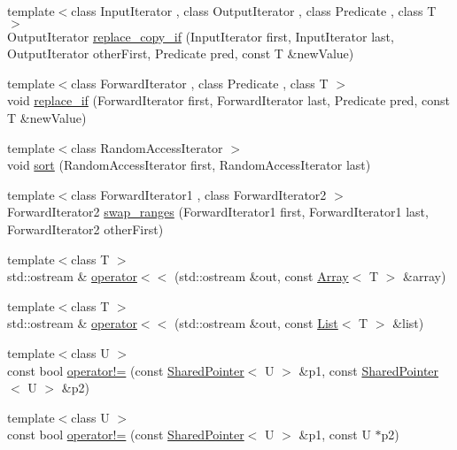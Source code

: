 \begin{DoxyCompactItemize}
\item 
{\footnotesize template$<$class Input\+Iterator , class Output\+Iterator , class Predicate , class T $>$ }\\Output\+Iterator \hyperlink{namespaceprism_a55d702599739f7137516dcd095119f15}{replace\+\_\+copy\+\_\+if} (Input\+Iterator first, Input\+Iterator last, Output\+Iterator other\+First, Predicate pred, const T \&new\+Value)
\item 
{\footnotesize template$<$class Forward\+Iterator , class Predicate , class T $>$ }\\void \hyperlink{namespaceprism_af118c19f6b5448319eb3aaf2d556ac54}{replace\+\_\+if} (Forward\+Iterator first, Forward\+Iterator last, Predicate pred, const T \&new\+Value)
\item 
{\footnotesize template$<$class Random\+Access\+Iterator $>$ }\\void \hyperlink{namespaceprism_af8ceeac6329dade75da361abe8b15c5f}{sort} (Random\+Access\+Iterator first, Random\+Access\+Iterator last)
\item 
{\footnotesize template$<$class Forward\+Iterator1 , class Forward\+Iterator2 $>$ }\\Forward\+Iterator2 \hyperlink{namespaceprism_a4661f2c0c4dca098c137179b4d93f3dc}{swap\+\_\+ranges} (Forward\+Iterator1 first, Forward\+Iterator1 last, Forward\+Iterator2 other\+First)
\item 
{\footnotesize template$<$class T $>$ }\\std\+::ostream \& \hyperlink{namespaceprism_a403ca8f79c481a89132691c0fd8c3a06}{operator$<$$<$} (std\+::ostream \&out, const \hyperlink{classprism_1_1_array}{Array}$<$ T $>$ \&array)
\item 
{\footnotesize template$<$class T $>$ }\\std\+::ostream \& \hyperlink{namespaceprism_a50da64555d454821545fe0311fde6a62}{operator$<$$<$} (std\+::ostream \&out, const \hyperlink{classprism_1_1_list}{List}$<$ T $>$ \&list)
\item 
{\footnotesize template$<$class U $>$ }\\const bool \hyperlink{namespaceprism_a9df924e4deb059bf1200701c8235410a}{operator!=} (const \hyperlink{classprism_1_1_shared_pointer}{Shared\+Pointer}$<$ U $>$ \&p1, const \hyperlink{classprism_1_1_shared_pointer}{Shared\+Pointer}$<$ U $>$ \&p2)
\item 
{\footnotesize template$<$class U $>$ }\\const bool \hyperlink{namespaceprism_ad6391c124e006b0e3a3ec67f55e208b0}{operator!=} (const \hyperlink{classprism_1_1_shared_pointer}{Shared\+Pointer}$<$ U $>$ \&p1, const U $\ast$p2)

\end{DoxyCompactItemize}

